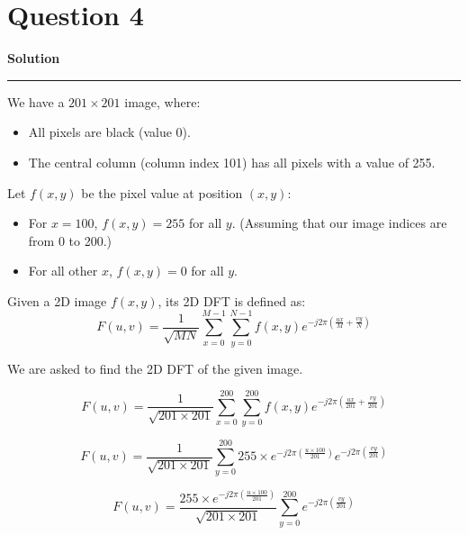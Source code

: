\documentclass[a4paper]{article}
\title{\cooltitle{CS663 Assignment-3}}
\author{{\bf Saksham Rathi, Kavya Gupta, Shravan Srinivasa Raghavan} \\
\small Department of Computer Science, \\
Indian Institute of Technology Bombay \\}
\date{}
\newenvironment{solution}[2][]{%
    \begin{mdframed}[linecolor=green!60!black, linewidth=2pt, roundcorner=10pt, backgroundcolor=green!5!white, skipabove=12pt, skipbelow=12pt]%
        \textbf{\large #2} %
        \par\noindent\rule{\textwidth}{0.4pt} %
        \vspace{0.5em} %
}{%
    \end{mdframed}%
}
\begin{document}
\maketitle
\section*{Question 4}

\begin{solution}{Solution}
    We have a $201\times 201$ image, where:
\begin{itemize}
    \item All pixels are black (value 0).
    \item The central column (column index 101) has all pixels with a value of 255.
\end{itemize}

Let $f(x, y)$ be the pixel value at position $(x, y)$:
\begin{itemize}
    \item For $x = 100$, $f(x, y) = 255$ for all $y$. (Assuming that our image indices are from 0 to 200.)
    \item For all other $x$, $f(x, y) = 0$ for all $y$.
\end{itemize}

Given a 2D image $f(x, y)$, its 2D DFT is defined as:
\begin{equation}
    F(u, v) = \frac{1}{\sqrt{MN}}\sum_{x=0}^{M-1} \sum_{y=0}^{N-1} f(x, y) e^{-j2\pi\left(\frac{ux}{M} + \frac{vy}{N}\right)}
\end{equation}

We are asked to find the 2D DFT of the given image.

\begin{equation}
    F(u, v) = \frac{1}{\sqrt{201\times 201}}\sum_{x=0}^{200} \sum_{y=0}^{200} f(x, y) e^{-j2\pi\left(\frac{ux}{201} + \frac{vy}{201}\right)}
\end{equation}

\begin{equation}
    F(u, v) = \frac{1}{\sqrt{201\times 201}} \sum_{y=0}^{200} 255\times e^{-j2\pi\left(\frac{u\times 100}{201}\right)} e^{-j2\pi\left(\frac{vy}{201}\right)}
\end{equation}

\begin{equation}
    F(u, v) = \frac{255\times e^{-j2\pi\left(\frac{u\times 100}{201}\right)}}{\sqrt{201\times 201}} \sum_{y=0}^{200} e^{-j2\pi\left(\frac{vy}{201}\right)}
\end{equation}


\end{solution}
\end{document}
